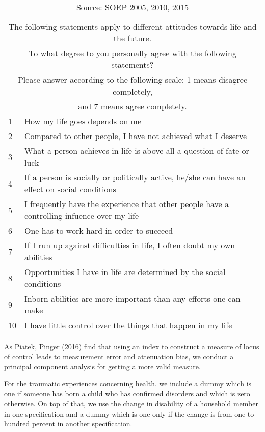 \documentclass[12pt, a4paper, fleqn, parskip]{scrartcl}
\begin{document}
\begin{table}[h!]
	\centering
	\begin{tabular}{ |p{1cm}||p{14cm}|  }
	\hline
	\multicolumn{2}{|c|}{The following statements apply to different attitudes towards life and the future.} \\
	\multicolumn{2}{|c|}{To what degree to you personally agree with the following statements?} \\
	\multicolumn{2}{|c|}{Please answer according to the following scale: 1 means disagree completely,}\\
	\multicolumn{2}{|c|}{and 7 means agree completely.}   \\
	\hline
	1   & How my life goes depends on me    \\
	2&   Compared to other people, I have not achieved what I deserve  \\
	3 & What a person achieves in life is above all a question of fate or luck\\
	4 & If a person is socially or politically active, he/she can have an effect on social conditions\\
	5& I frequently have the experience that other people have a controlling infuence over my life\\
	6 & One has to work hard in order to succeed\\
	7 & If I run up against difficulties in life, I often doubt my own abilities\\
	8 & Opportunities I have in life are determined by the social conditions\\
	9 & Inborn abilities are more important than any efforts one can make\\
	10 & I have little control over the things that happen in my life\\
	\hline
	\end{tabular}
	\caption{Source: SOEP 2005, 2010, 2015}
\end{table}

As Piatek, Pinger (2016) find that using an index to construct a measure of
locus of control leads to measurement error and attenuation bias, we conduct a
principal component analysis for getting a more valid measure.

For the traumatic experiences concerning health, we include a dummy which is
one if someone has born a child who has confirmed disorders and which is zero
otherwise. On top of that, we use the change in disability of a household
member in one specification and a dummy which is one only if the change is from
one to hundred percent in another specification.
\end{document}
